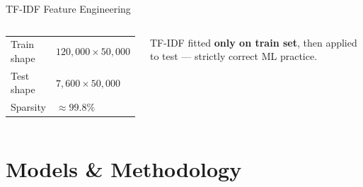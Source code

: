 \documentclass[aspectratio=169,11pt]{beamer}
\begin{document}
\begin{frame}{TF-IDF Feature Engineering}
\begin{columns}[T]
    \begin{tcolorbox}[colback=light,colframe=primary,title=Matrix Properties,fonttitle=\footnotesize\bfseries]
      \footnotesize
      \begin{tabular}{ll}
        Train shape & $120{,}000 \times 50{,}000$ \\
        Test shape  & $7{,}600   \times 50{,}000$ \\
        Sparsity    & $\approx 99.8\%$ \\
      \end{tabular}
    \end{tcolorbox}
    \vspace{-0.2cm}
    \begin{tcolorbox}[colback=greencol!8,colframe=greencol,fonttitle=\footnotesize\bfseries,title=No Data Leakage!]
      \footnotesize
      TF-IDF fitted \textbf{only on train set}, then applied to test --- strictly correct ML practice.
    \end{tcolorbox}
\end{columns}
\end{frame}

\section{Models \& Methodology}
\end{document}
